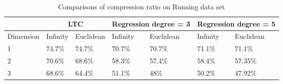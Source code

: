 \begin{table}[]
\begin{tabular}{|l|l|l|l|l|l|l|l|}
\hline
           & \multicolumn{2}{c|}{LTC} & \multicolumn{2}{c|}{Regression degree = 3} & \multicolumn{3}{l|}{Regression degree = 5}          \\ \hline
Dimension & Infinity   & Euclidean   & Infinity            & Euclidean           & Infinity& \multicolumn{2}{l|}{Euclidean} \\ \hline
1          & 74.7\%     & 74.7\%      & 70.7\%      & 70.7\%        & 71.1\%        & \multicolumn{2}{l|}{71.1\%}    \\ \hline
2          & 70.6\%     & 68.6\%      & 58.3\%      & 57.4\%        & 58.4\%        & \multicolumn{2}{l|}{57.35\%}   \\ \hline
3          & 68.6\%     & 64.4\%      & 51.1\%      & 48\%          & 50.2\%        & \multicolumn{2}{l|}{47.92\%}   \\ \hline
\end{tabular}
\caption{Comparisons of compression ratio on Running data set}
\label{table:CR-compare-running}
\end{table}
